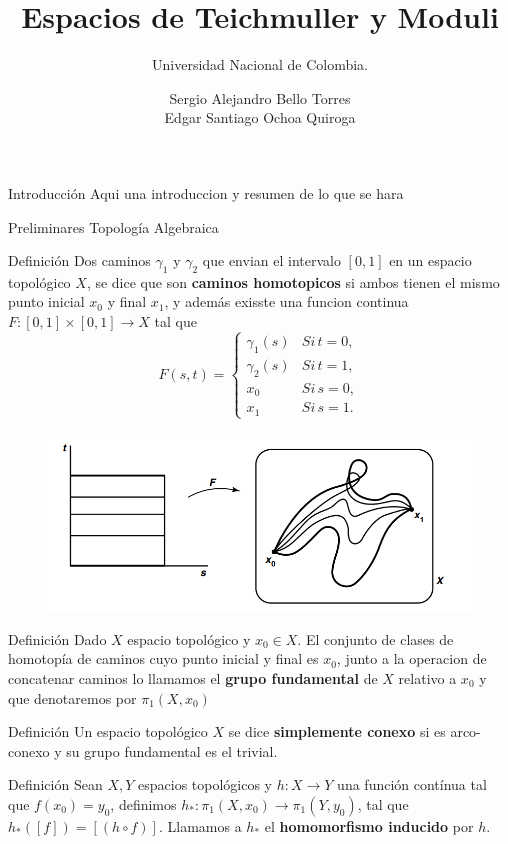 \documentclass[xcolor=dvipsnames,10pt]{beamer}
\title[Universidad Nacional de Colombia]{Espacios de Teichmuller y Moduli}
\subtitle{Universidad  Nacional de Colombia.}
\author[Superficies de Riemann]{Sergio Alejandro Bello Torres\\
Edgar Santiago Ochoa Quiroga}
\date[\textcolor{white}{Julio/2025}]
\begin{document}
\maketitle
\begin{frame}{Introducción}
Aqui una introduccion y resumen de lo que se hara


\end{frame}
\begin{frame}{Preliminares Topología Algebraica}

    \begin{block}{Definición}
        Dos caminos $\gamma_1$ y $\gamma_2$ que envian el intervalo $[0,1]$ en un espacio topológico $X$, se dice que son \textbf{caminos homotopicos} si ambos tienen el mismo punto inicial $x_0$ y final $x_1$, y además exisste una funcion continua $F:[0,1]\times[0,1]\to X$ tal que
        $$F(s,t)=\begin{cases}
        \gamma_1(s) & Si\,t=0,\\
        \gamma_2(s) & Si\,t=1,\\
        x_0& Si\,s=0,\\
        x_1& Si\,s=1.
        \end{cases}$$
        \end{block}
        \begin{figure}
        \centering
        \includegraphics[width=0.5\linewidth]{Imagenes/imagen_2025-07-10_112455145.png}
    \end{figure}
\end{frame}
\begin{frame}
    \begin{block}{Definición}
        Dado $X$ espacio topológico y $x_0\in X$. El conjunto de clases de homotopía de caminos cuyo punto inicial y final es $x_0$, junto a la operacion de concatenar caminos lo llamamos el \textbf{grupo fundamental} de $X$ relativo a $x_0$ y que denotaremos por $\pi_1(X,x_0)$
        \end{block}

        \begin{block}{Definición}
        Un espacio topológico $X$ se dice \textbf{simplemente conexo} si es arco-conexo y su grupo fundamental es el trivial.
        \end{block}  
        \begin{block}{Definición}
            Sean $X,Y$ espacios topológicos y $h: X \rightarrow Y$ una función contínua tal que $f(x_0) = y_0$, definimos $h_*:\pi_1(X,x_0)\rightarrow \pi_1(Y,y_0)$, tal que $h_*([f]) = [(h \circ f)]$. Llamamos a $h_*$ el \textbf{homomorfismo inducido} por $h$.
        \end{block}
\end{frame}
\end{document}
